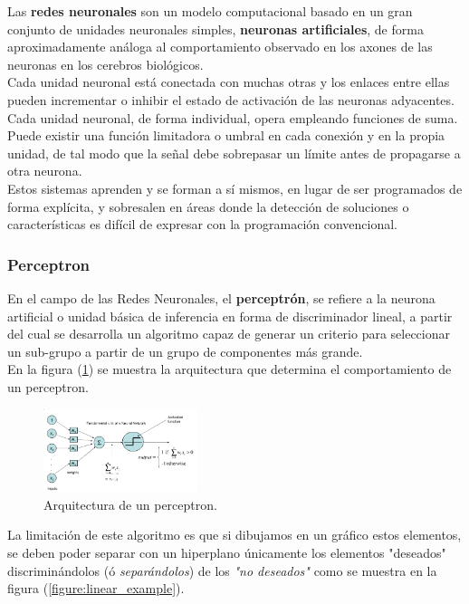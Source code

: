 \documentclass[osajnl,twocolumn,showpacs,superscriptaddress,10pt]{revtex4-1} %
\begin{document}
Las \textbf{redes neuronales} son un modelo computacional basado en un gran conjunto de unidades neuronales simples, \textbf{neuronas artificiales}, de forma aproximadamente análoga al comportamiento observado en los axones de las neuronas en los cerebros biológicos. \\

Cada unidad neuronal está conectada con muchas otras y los enlaces entre ellas pueden incrementar o inhibir el estado de activación de las neuronas adyacentes. Cada unidad neuronal, de forma individual, opera empleando funciones de suma. Puede existir una función limitadora o umbral en cada conexión y en la propia unidad, de tal modo que la señal debe sobrepasar un límite antes de propagarse a otra neurona. \\

Estos sistemas aprenden y se forman a sí mismos, en lugar de ser programados de forma explícita, y sobresalen en áreas donde la detección de soluciones o características es difícil de expresar con la programación convencional.

\subsubsection{Perceptron}

En el campo de las Redes Neuronales, el \textbf{perceptrón}, se refiere a la neurona artificial o unidad básica de inferencia en forma de discriminador lineal, a partir del cual se desarrolla un algoritmo capaz de generar un criterio para seleccionar un sub-grupo a partir de un grupo de componentes más grande. \\

En la figura (\ref{figure:perceptron_example}) se muestra la arquitectura que determina el comportamiento de un perceptron.

\begin{figure}[H]
    \centering
    \includegraphics[width=0.4\textwidth]{theory/perceptron}
    \caption{Arquitectura de un perceptron.}
    \label{figure:perceptron_example}
\end{figure}

La limitación de este algoritmo es que si dibujamos en un gráfico estos elementos, se deben poder separar con un hiperplano únicamente los elementos "deseados" discriminándolos (ó \textit{separándolos}) de los \textit{"no deseados"} como se muestra en la figura (\ref{figure:linear_example}).
\end{document}
